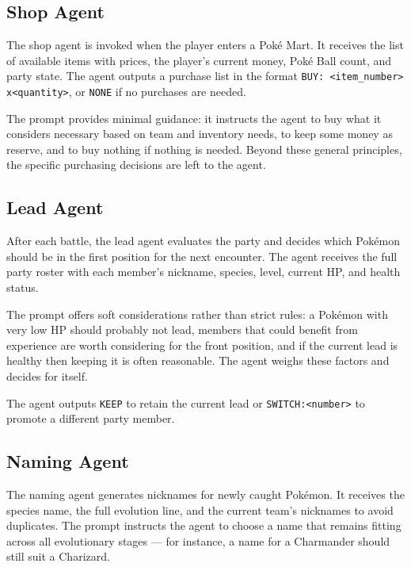 \documentclass{article}
\begin{document}
\subsection{Shop Agent}

The shop agent is invoked when the player enters a Pok\'{e} Mart. It receives the list of available items with prices, the player's current money, Pok\'{e} Ball count, and party state. The agent outputs a purchase list in the format \texttt{BUY: <item\_number> x<quantity>}, or \texttt{NONE} if no purchases are needed.

The prompt provides minimal guidance: it instructs the agent to buy what it considers necessary based on team and inventory needs, to keep some money as reserve, and to buy nothing if nothing is needed. Beyond these general principles, the specific purchasing decisions are left to the agent.

\subsection{Lead Agent}

After each battle, the lead agent evaluates the party and decides which Pok\'{e}mon should be in the first position for the next encounter. The agent receives the full party roster with each member's nickname, species, level, current HP, and health status.

The prompt offers soft considerations rather than strict rules: a Pok\'{e}mon with very low HP should probably not lead, members that could benefit from experience are worth considering for the front position, and if the current lead is healthy then keeping it is often reasonable. The agent weighs these factors and decides for itself.

The agent outputs \texttt{KEEP} to retain the current lead or \texttt{SWITCH:<number>} to promote a different party member.

\subsection{Naming Agent}

The naming agent generates nicknames for newly caught Pok\'{e}mon. It receives the species name, the full evolution line, and the current team's nicknames to avoid duplicates. The prompt instructs the agent to choose a name that remains fitting across all evolutionary stages --- for instance, a name for a Charmander should still suit a Charizard.
\end{document}
